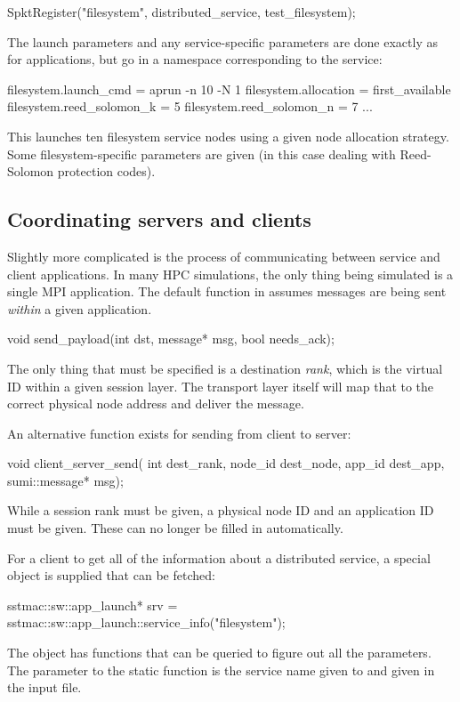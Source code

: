 \begin{CppCode}
SpktRegister("filesystem", distributed_service, test_filesystem);
\end{CppCode}
The launch parameters and any service-specific parameters are done exactly as for applications, but go in a namespace corresponding to the service:

\begin{ViFile}
filesystem.launch_cmd = aprun -n 10 -N 1
filesystem.allocation = first_available
filesystem.reed_solomon_k = 5
filesystem.reed_solomon_n = 7
...
\end{ViFile}
This launches ten filesystem service nodes using a given node allocation strategy.
Some filesystem-specific parameters are given (in this case dealing with Reed-Solomon protection codes).

\subsection{Coordinating servers and clients}
\label{subsec:coordinatingServersClients}
Slightly more complicated is the process of communicating between service and client applications.
In many HPC simulations, the only thing being simulated is a single MPI application.
The default  function in  assumes messages are being sent \emph{within} a given application.

\begin{CppCode}
void send_payload(int dst, message* msg, bool needs_ack);
\end{CppCode}
The only thing that must be specified is a destination \emph{rank}, which is the virtual ID within a given session layer.
The transport layer itself will map that to the correct physical node address and deliver the message.

An alternative function exists for sending from client to server:

\begin{CppCode}
void client_server_send(
  int dest_rank,
  node_id dest_node,
  app_id dest_app,
  sumi::message* msg);
\end{CppCode}
While a session rank must be given, a physical node ID and an application ID must be given.
These can no longer be filled in automatically.

For a client to get all of the information about a distributed service, a special object is supplied that can be fetched:

\begin{CppCode}
sstmac::sw::app_launch* srv = sstmac::sw::app_launch::service_info("filesystem");
\end{CppCode}
The object  has functions that can be queried to figure out all the  parameters.  
The parameter to the static  function is the service name given to  and given in the input file.

